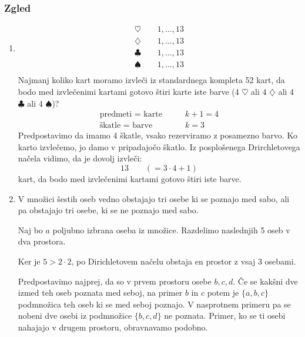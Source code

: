 \subsubsection{Zgled}
\begin{enumerate}[label=\roman*.]
    \item 
    \begin{align*}
        \heartsuit \text{ }\text{ }\text{ } 1, \dots, 13 \\
        \diamondsuit \text{ }\text{ }\text{ } 1, \dots, 13 \\
        \clubsuit \text{ }\text{ }\text{ } 1, \dots, 13 \\
        \spadesuit \text{ }\text{ }\text{ } 1, \dots, 13 \\
    \end{align*}
    Najmanj koliko kart moramo izvleči iz standardnega kompleta 52 kart, da bodo med izvlečenimi kartami gotovo štiri karte iste barve (4 $\heartsuit$ ali 4 $\diamondsuit$ ali 4 $\clubsuit$ ali 4 $\spadesuit$)?
    \begin{align*}
        \text{predmeti = karte} \text{ }\text{ }\text{ } & k + 1 = 4 \\
        \text{škatle = barve} \text{ }\text{ }\text{ } & k = 3
    \end{align*}
    Predpostavimo da imamo 4 škatle, vsako rezerviramo z posamezno barvo. Ko karto izvlečemo, jo damo v pripadajočo škatlo. Iz posplošenega Drirchletovega načela vidimo, da je dovolj izvleči:
    $$
    13 \text{ }\text{ }\text{ } ( = 3 \cdot 4 + 1)
    $$
    kart, da bodo med izvlečenimi kartami gotovo štiri iste barve.
    \item V množici šestih oseb vedno obstajajo tri osebe ki se poznajo med sabo, ali pa obstajajo tri osebe, ki se ne poznajo med sabo.
    
    Naj bo $a$ poljubno izbrana oseba iz množice. Razdelimo naslednjih 5 oseb v dva prostora.
    
    Ker je $5 > 2 \cdot 2$, po Dirichletovem načelu obstaja en prostor z vsaj 3 osebami.
    
    Predpostavimo najprej, da so v prvem prostoru osebe $b, c, d$. Če se kakšni dve izmed teh oseb poznata med seboj, na primer $b$ in $c$ potem je $\{a, b, c\}$ podmnožica teh oseb ki se med seboj poznajo. V nasprotnem primeru pa se nobeni dve osebi iz podmnožice $\{b, c, d\}$ ne poznata. Primer, ko se ti osebi nahajajo v drugem prostoru, obravnavamo podobno.
\end{enumerate}
